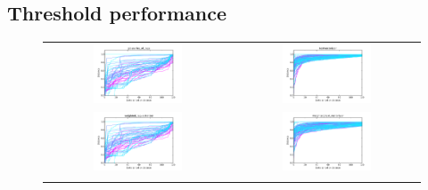 \subsection{Threshold performance}
\begin{figure}[h!]
\begin{tabular}{cc}
\includegraphics[width =0.5\textwidth]{images/thresh_cosine_glossaries_of_tags} 		& \includegraphics[width =0.5\textwidth]{images/thresh_cosine_textvectorizer} \\ \relax
\includegraphics[width =0.5\textwidth]{images/thresh_cosine_weighted_tagvectorizer}	& \includegraphics[width =0.5\textwidth]{images/thresh_cosine_weighted_text_vectorizer} \\ \relax

\end{tabular}
\end{figure}
